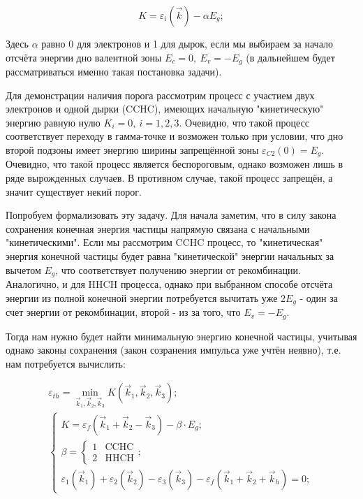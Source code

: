 \documentclass[../main.tex]{subfiles}
\begin{document}
    \begin{equation*}
        K = \varepsilon_i(\vec{k}) - \alpha E_g;
    \end{equation*}

    Здесь $\alpha$ равно 0 для электронов и 1 для дырок, если мы выбираем за 
    начало отсчёта энергии дно валентной зоны $E_c = 0,~E_v = -E_g$
    (в дальнейшем будет рассматриваться именно такая постановка задачи).

    Для демонстрации наличия порога рассмотрим процесс с участием двух 
    электронов и одной дырки (CCHC), имеющих начальную "кинетическую" энергию 
    равную нулю $K_i = 0,~i=1,2,3$. Очевидно, что такой процесс соответствует
    переходу в гамма-точке и возможен только при условии, что дно второй подзоны
    имеет энергию ширины запрещённой зоны $\varepsilon_{C2}(0) = E_g$. Очевидно,
    что такой процесс является беспороговым, однако возможен лишь в ряде
    вырожденных случаев. В противном случае, такой процесс запрещён, а значит 
    существует некий порог.

    Попробуем формализовать эту задачу. Для начала заметим, что в силу закона
    сохранения конечная энергия частицы напрямую связана с начальными "кинетическими".
    Если мы рассмотрим CCHC процесс, то "кинетическая" энергия конечной частицы
    будет равна "кинетической" энергии начальных за вычетом $E_g$, что соответствует
    получению энергии от рекомбинации. Аналогично, и для HHCH процесса, однако
    при выбранном способе отсчёта энергии из полной конечной энергии потребуется 
    вычитать уже $2E_g$ - один за счет энергии от рекомбинации, второй - из за того, 
    что $E_v = - E_g$.

    Тогда нам нужно будет найти минимальную энергию конечной частицы, учитывая
    однако законы сохранения (закон созранения импульса уже учтён неявно), 
    т.е. нам потребуется вычислить: 

    \begin{equation}
        \begin{array}{l}
            \label{gfunc}
            \varepsilon_{th} = \min_{\vec{k}_1, \vec{k}_2, \vec{k}_3} K (\vec{k}_1, \vec{k}_2, \vec{k}_3);\\
            \begin{cases}
                K  = \varepsilon_f(\vec{k}_1 + \vec{k}_2 - \vec{k}_3) - \beta \cdot E_g;\\
                \beta = \begin{cases}
                            1   & \text{CCHC}\\
                            2   & \text{HHCH}
                        \end{cases};\\
                \varepsilon_1(\vec{k}_1) + \varepsilon_2(\vec{k}_2) - \varepsilon_3(\vec{k}_3) - \varepsilon_f(\vec{k}_1 + \vec{k}_2 + \vec{k}_h) = 0;
            \end{cases}
        \end{array}
    \end{equation}
\end{document}
